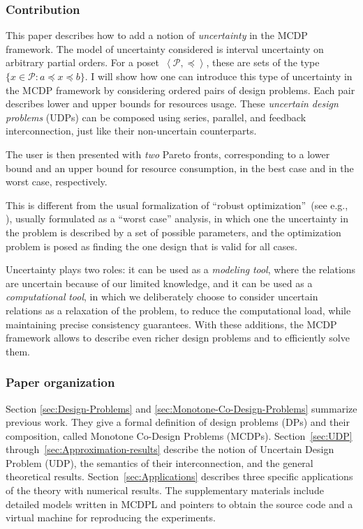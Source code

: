 \documentclass[twocolumn,english]{IEEEconf}
\theoremstyle{plain}
\theoremstyle{definition}
\theoremstyle{definition}
\theoremstyle{plain}
\newcommand{\posleq}{\preceq}
\newcommand{\posA}{\mathcal{P}}
\begin{document}
\subsubsection*{Contribution}

This paper describes how to add a notion of \emph{uncertainty} in
the MCDP framework. The model of uncertainty considered is interval
uncertainty on arbitrary partial orders. For a poset~$\left\langle \posA,\posleq\right\rangle $,
these are sets of the type~$\{x\in\posA\colon a\posleq x\posleq b\}$.
I will show how one can introduce this type of uncertainty in the
MCDP framework by considering ordered pairs of design problems. Each
pair describes lower and upper bounds for resources usage. These \emph{uncertain
design problems} (UDPs) can be composed using series, parallel, and
feedback interconnection, just like their non-uncertain counterparts. 

The user is then presented with \emph{two} Pareto fronts, corresponding
to a lower bound and an upper bound for resource consumption, in the
best case and in the worst case, respectively. 

This is different from the usual formalization of ``robust optimization''~(see
e.g., \cite{bertsimas11theory,ben-tal09}), usually formulated as
a ``worst case'' analysis, in which one the uncertainty in the problem
is described by a set of possible parameters, and the optimization
problem is posed as finding the one design that is valid for all cases. 

Uncertainty plays two roles: it can be used as a \emph{modeling} \emph{tool},
where the relations are uncertain because of our limited knowledge,
and it can be used as a \emph{computational} \emph{tool}, in which
we deliberately choose to consider uncertain relations as a relaxation
of the problem, to reduce the computational load, while maintaining
precise consistency guarantees. With these additions, the MCDP framework
allows to describe even richer design problems and to efficiently
solve them.


\subsubsection*{Paper organization}

Section \ref{sec:Design-Problems} and \ref{sec:Monotone-Co-Design-Problems}
summarize previous work. They give a formal definition of design problems
(DPs) and their composition, called Monotone Co-Design Problems (MCDPs).
Section~\ref{sec:UDP} through~\ref{sec:Approximation-results}
describe the notion of Uncertain Design Problem (UDP), the semantics
of their interconnection, and the general theoretical results. Section~\ref{sec:Applications}
describes three specific applications of the theory with numerical
results. The supplementary materials include detailed models written
in MCDPL and pointers to obtain the source code and a virtual machine
for reproducing the experiments.
\end{document}
